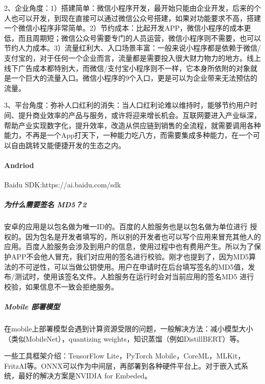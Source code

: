 \documentclass[letterpaper,11pt,english]{sphinxmanual}
\begin{document}
2、企业角度：1）搭建简单：微信小程序开发，最开始只能由企业开发，后来的个人也可以开发，到现在直接可以通过微信公众号搭建，如果对功能要求不高，搭建一个微信小程序非常简单。2）节约成本：比起开发APP，微信小程序的成本更低，而且周期短；微信公众号需要专门的人员运营，微信小程序则不需要，也可以节约人力成本。3）流量红利大、入口场景丰富：一般来说小程序都是依赖于微信/支付宝的，对于任何一个企业而言，流量都是需要投入很大财力物力的地方。线上线下广告成本都特别大，而微信/支付宝小程序则不一样，它本身所依附的对象就是一个巨大的流量入口。微信小程序的9个入口，更是可以为企业带来无法预估的流量。

3、平台角度：弥补人口红利的消失：当人口红利论难以维持时，能够节约用户时间、提升商业效率的产品与服务，或许将迎来增长机会。互联网要进入产业纵深，帮助产业实现数字化，提升效率，改造从供应链到销售的全流程，就需要调用各种能力，不再是一个App打天下，一种能力吃八方，而需要集成多种能力，在一个可以自由跳转又能便捷开发的生态之内。


\paragraph{Andriod}
\label{\detokenize{chapter_AI_dive/mobile:andriod}}
Baidu SDK:https://ai.baidu.com/sdk


\subparagraph{为什么需要签名 MD5？2\sphinxfootnotemark[860]}
\label{\detokenize{chapter_AI_dive/mobile:md5-2}}%
\begin{footnotetext}[860]\sphinxAtStartFootnote
{}
%
\end{footnotetext}\ignorespaces 
安卓的应用是以包名做为唯一ID的。百度的人脸服务也是以包名做为单位进行
授权的。因为包名是开发者填写的，所以别的开发者也可以写个应用来冒充其他人的应用。百度人脸服务会涉及到用户的信息，使用过程中也有费用产生。所以为了保护APP不会他人冒充，我们对应用的签名进行校验。刚才也提到了，因为MD5算法的不可逆性，可以当做公钥使用。用户在申请时在后台填写签名的MD5值，发布/测试时，使用该签名文件。人脸服务在运行时会对当前应用的签名MD5
进行校验，如果信息不一致会拒绝服务。


\subparagraph{Mobile 部署模型}
\label{\detokenize{chapter_AI_dive/mobile:mobile}}
在mobile上部署模型会遇到计算资源受限的问题，一般解决方法：减小模型大小（类似MobileNet），quantizing
weights，知识蒸馏（例如DistillBERT）等。

一些工具框架介绍：TensorFlow Lite，PyTorch
Mobile，CoreML，MLKit，FritzAI等。ONNX可以作为中间层，再部署到各种硬件平台上。对于嵌入式系统，最好的解决方案是NVIDIA
for Embeded。
\end{document}
